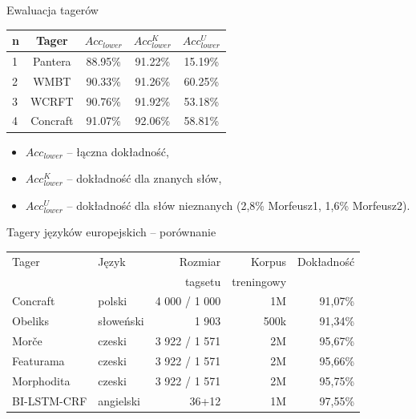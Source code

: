 \documentclass[xcolor=dvipsnames,polish]{beamer}
\begin{document}
\begin{frame}{Ewaluacja tagerów}
\begin{center}
\begin{tabular}{lcccc} \hline
n & Tager 		& $Acc_{lower}$	& $Acc^K_{lower}$	& $Acc^U_{lower}$	\\ \hline
1 & Pantera   & 88.95\%   & 91.22\% & 15.19\% \\
2 & WMBT	 	& 90.33\%		& 91.26\%	& 60.25\%	\\
3 & WCRFT	 	& 90.76\%		& 91.92\%	& 53.18\%	\\
4 & Concraft	& 91.07\%		& 92.06\%	& 58.81\%	\\
\end{tabular}
\end{center}
\begin{itemize}
\item $Acc_{lower}$ -- łączna dokładność,
\item $Acc^K_{lower}$ -- dokładność dla znanych słów,
\item $Acc^U_{lower}$ -- dokładność dla słów nieznanych (2,8\% Morfeusz1, 1,6\% Morfeusz2).
\end{itemize}
\end{frame}

\begin{frame}{Tagery języków europejskich -- porównanie}
  \begin{center}
  \begin{tabular}{l|l|r|r|r}
    Tager       & Język     & Rozmiar & Korpus  & Dokładność \\
                &           & tagsetu & treningowy & \\ \hline
    Concraft    & polski    & 4 000 / 1 000 & 1M    & 91,07\% \\
    Obeliks     & słoweński & 1 903 & 500k  & 91,34\% \\
    Morče       & czeski    & 3 922 / 1 571 & 2M    & 95,67\% \\
    Featurama   & czeski    & 3 922 / 1 571 & 2M    & 95,66\% \\
    Morphodita  & czeski    & 3 922 / 1 571 & 2M    & 95,75\% \\
    BI-LSTM-CRF & angielski & 36+12   & 1M   & 97,55\% \\
  \end{tabular}
  \end{center}
\end{frame}
\end{document}
